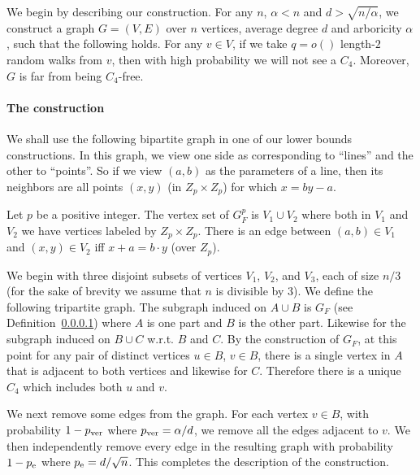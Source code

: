 We begin by describing our construction. For any $n$, $\alpha < n$ and $d> \sqrt{n/\alpha}$, we construct a graph $G = (V, E)$ over $n$ vertices, average degree $d$ and arboricity $\alpha$, such that the following holds.
For any $v\in V$, if we take $q = o()$ length-$2$ random walks from $v$, then with high probability we will not see a $C_4$.
Moreover, $G$ is far from being $C_4$-free. 


\paragraph{The construction}
We shall use the following bipartite graph in one of our lower bounds constructions. 
In this graph, we view one side as corresponding to “lines” and the other to “points”.
So if we view $(a,b)$ as the parameters of a line, then its neighbors are all points $(x,y)$ (in $Z_p \times Z_p$) for which $x = b y  - a$. 

\begin{definition}
Let $p$ be a positive integer.
The vertex set of $G^p_F$ is $V_1\cup V_2$ where both in $V_1$ and $V_2$ we have vertices labeled by $Z_p \times Z_p$. There is an edge between $(a,b)\in V_1$ and $(x,y)\in V_2$ iff $x+ a = b\cdot y$ (over $Z_p$). 
\end{definition}

We begin with three disjoint subsets of vertices $V_1$, $V_2$, and $V_3$, each of size $n/3$ (for the sake of brevity we assume that $n$ is divisible by $3$).
We define the following tripartite graph. 
The subgraph induced on $A\cup B$ is $G_F$ (see Definition~\ref{}) where $A$ is one part and $B$ is the other part. Likewise for the subgraph induced on $B\cup C$ w.r.t. $B$ and $C$.
By the construction of $G_F$, at this point for any pair of distinct vertices $u\in B$, $v\in B$, there is a single vertex in $A$ that is adjacent to both vertices and likewise for $C$.
Therefore there is a unique $C_4$ which includes both $u$ and $v$.

We next remove some edges from the graph. For each vertex $v\in B$, with probability $1- p_{\rm ver}$ where $p_{\rm ver} = \alpha/d$, we remove all the edges adjacent to $v$. We then independently remove every edge in the resulting graph with probability $1- p_{\rm e}$ where $p_{\rm e} = d/\sqrt{n}$. This completes the description of the construction. 

